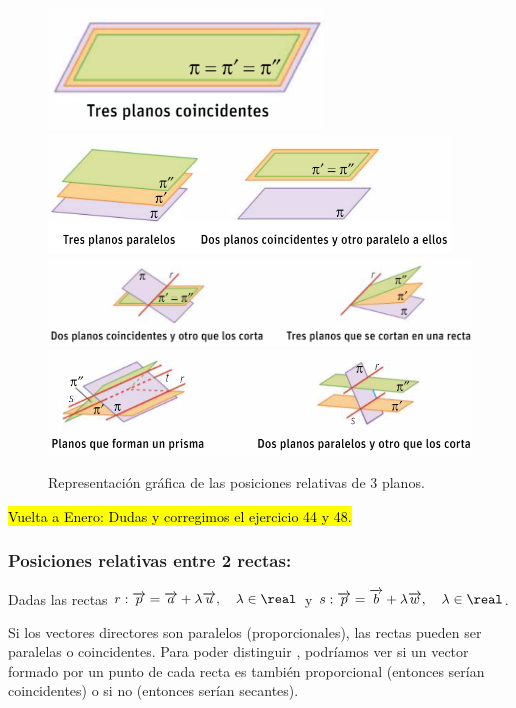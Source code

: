 \begin{figure}[hptb]
    \centering
    \includegraphics[width=0.65\textwidth]{img/Captura1.png}
    \includegraphics[width=0.95\textwidth]{img/Captura2.png}
    \includegraphics[width=1.1\textwidth]{img/Captura3.png}
    \includegraphics[width=1.1\textwidth]{img/Captura4.png}
    \caption{Representación gráfica de las posiciones relativas de 3 planos.}
    \label{fig:PosicionesRelativasPlanos}
\end{figure}

\hl{Vuelta a Enero: Dudas y corregimos el ejercicio 44 y 48.}

\subsubsection{Posiciones relativas entre 2 rectas:}

Dadas las rectas 
$r:\vec{p} = \vec{a} + \lambda\vec{u},\quad \lambda\in\real$
y
$s:\vec{p} = \vec{b} + \lambda\vec{w},\quad \lambda\in\real$. 

Si los vectores directores son paralelos (proporcionales), las rectas pueden ser paralelas o coincidentes. 
%
Para poder distinguir , podríamos ver si un vector formado por un punto de cada recta es también proporcional (entonces serían coincidentes) o si no (entonces serían secantes).

